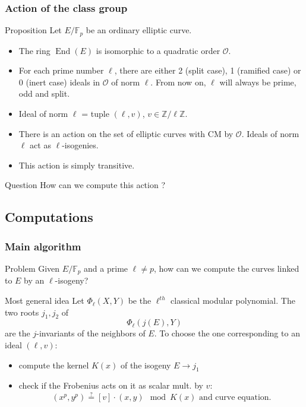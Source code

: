 \documentclass[12pt]{beamer}
\newcommand{\F}{\ensuremath{\mathbb{F}}}
\newcommand{\Z}{\ensuremath{\mathbb{Z}}}
\renewcommand{\O}{\ensuremath{\mathcal{O}}}
\DeclareMathOperator{\End}{End}
\begin{document}
\begin{frame}
 
 \frametitle{Action of the class group}
 
 \vspace{-3mm} 
 \begin{block}{Proposition}
  Let $E/\F_p$ be an ordinary elliptic curve.
  \begin{itemize}
   \item The ring $\End(E)$ is isomorphic to a quadratic order $\O$.
   \item For each prime number $\ell$, there are either 2 (split case), 1 (ramified case) or 0 (inert case) ideals in $\O$ of norm $\ell$. \newline
    \alert{From now on, $\ell$ will always be prime, odd and split.}
   \item Ideal of norm $\ell$ = tuple $(\ell, v)$, $v\in \Z/\ell\Z$.
   \item There is an action on the set of elliptic curves with CM by $\O$. Ideals of norm $\ell$ act as $\ell$-isogenies.
   \item This action is simply transitive.
  \end{itemize}
 \end{block}
 
 \pause
 \vspace{-1mm}
 \begin{alertblock}{Question}
  How can we compute this action ?
 \end{alertblock}

\end{frame}




\subsection{Computations}

\begin{frame}
 \frametitle{Main algorithm}
 
 \vspace{-3mm}
 \begin{alertblock}{Problem}
  Given $E/\F_p$ and a prime $\ell\neq p$, how can we compute the curves linked to $E$ by an $\ell$-isogeny?
 \end{alertblock}

 \pause
 \vspace{-1mm}
 \begin{block}{Most general idea}
  Let $\Phi_\ell(X, Y)$ be the $\ell^{th}$ classical modular polynomial. The two roots $j_1, j_2$ of
  $$\Phi_\ell(j(E), Y)$$
  are the $j$-invariants of the neighbors of $E$. To choose the one corresponding to an ideal $(\ell, v)$:
  \begin{itemize}
   \item compute the kernel $K(x)$ of the isogeny $E\to j_1$
   \item check if the Frobenius acts on it as scalar mult. by $v$:
    \vspace{-4mm}
    $$(x^p, y^p) \overset{?}{=} [v]\cdot (x, y) \mod K(x) \text{ and curve equation}.$$
  \end{itemize}
 \end{block}
\end{frame}
\end{document}
